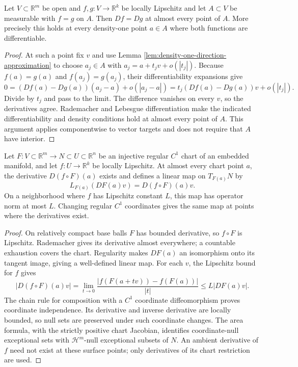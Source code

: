 \begin{proposition}\label{prop:agreement-set-equal-derivatives}
Let $V\subset\mathbb R^m$ be open and $f,g:V\to\mathbb R^k$ be locally Lipschitz and let $A\subset V$ be measurable with $f=g$ on $A$. Then $Df=Dg$ at almost every point of $A$. More precisely this holds at every density-one point $a\in A$ where both functions are differentiable.
\end{proposition}
\begin{proof}
At such a point fix $v$ and use Lemma \ref{lem:density-one-direction-approximation} to choose $a_j\in A$ with $a_j=a+t_jv+o(|t_j|)$. Because $f(a)=g(a)$ and $f(a_j)=g(a_j)$, their differentiability expansions give
\[
 0=(Df(a)-Dg(a))(a_j-a)+o(|a_j-a|)
   =t_j(Df(a)-Dg(a))v+o(|t_j|).
\]
Divide by $t_j$ and pass to the limit. The difference vanishes on every $v$, so the derivatives agree. Rademacher and Lebesgue differentiation make the indicated differentiability and density conditions hold at almost every point of $A$. This argument applies componentwise to vector targets and does not require that $A$ have interior.
\end{proof}

\begin{lemma}\label{lem:chart-tangential-differential}
Let $F:V\subset\mathbb R^m\to N\subset U\subset\mathbb R^n$ be an injective regular $C^1$ chart of an embedded manifold, and let $f:U\to\mathbb R^k$ be locally Lipschitz. At almost every chart point $a$, the derivative $D(f\circ F)(a)$ exists and defines a linear map on $T_{F(a)}N$ by
\[
 L_{F(a)}(DF(a)v)=D(f\circ F)(a)v.
\]
On a neighborhood where $f$ has Lipschitz constant $L$, this map has operator norm at most $L$. Changing regular $C^1$ coordinates gives the same map at points where the derivatives exist.
\end{lemma}
\begin{proof}
On relatively compact base balls $F$ has bounded derivative, so $f\circ F$ is Lipschitz. Rademacher gives its derivative almost everywhere; a countable exhaustion covers the chart. Regularity makes $DF(a)$ an isomorphism onto its tangent image, giving a well-defined linear map. For each $v$, the Lipschitz bound for $f$ gives
\[
 |D(f\circ F)(a)v|
 =\lim_{t\to0}\frac{|f(F(a+tv))-f(F(a))|}{|t|}
 \leq L|DF(a)v|.
\]
The chain rule for composition with a $C^1$ coordinate diffeomorphism proves coordinate independence. Its derivative and inverse derivative are locally bounded, so null sets are preserved under such coordinate changes. The area formula, with the strictly positive chart Jacobian, identifies coordinate-null exceptional sets with $\mathcal H^m$-null exceptional subsets of $N$. An ambient derivative of $f$ need not exist at these surface points; only derivatives of its chart restriction are used.
\end{proof}

